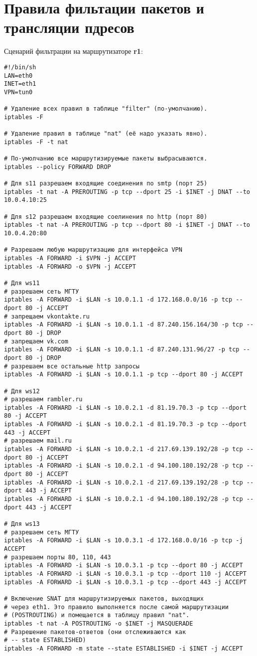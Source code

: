 \documentclass[a4paper,12pt]{article}
\begin{document}
\section{Правила фильтации пакетов и трансляции пдресов}

Сценарий фильтрации на маршрутизаторе \textbf{r1}:

\begin{Verbatim}
#!/bin/sh
LAN=eth0
INET=eth1
VPN=tun0

# Удаление всех правил в таблице "filter" (по-умолчанию).
iptables -F

# Удаление правил в таблице "nat" (её надо указать явно).
iptables -F -t nat

# По-умолчанию все маршрутизируемые пакеты выбрасываются.
iptables --policy FORWARD DROP

# Для s11 разрешаем входящие соединения по smtp (порт 25)
iptables -t nat -A PREROUTING -p tcp --dport 25 -i $INET -j DNAT --to 10.0.4.10:25

# Для s12 разрешаем входящие соелинения по http (порт 80)
iptables -t nat -A PREROUTING -p tcp --dport 80 -i $INET -j DNAT --to 10.0.4.20:80

# Разрешаем любую маршрутизацию для интерфейса VPN
iptables -A FORWARD -i $VPN -j ACCEPT
iptables -A FORWARD -o $VPN -j ACCEPT

# Для ws11
# разрешаем сеть МГТУ
iptables -A FORWARD -i $LAN -s 10.0.1.1 -d 172.168.0.0/16 -p tcp --dport 80 -j ACCEPT
# запрещаем vkontakte.ru
iptables -A FORWARD -i $LAN -s 10.0.1.1 -d 87.240.156.164/30 -p tcp --dport 80 -j DROP
# запрещаем vk.com
iptables -A FORWARD -i $LAN -s 10.0.1.1 -d 87.240.131.96/27 -p tcp --dport 80 -j DROP
# разрешаем все остальные http запросы
iptables -A FORWARD -i $LAN -s 10.0.1.1 -p tcp --dport 80 -j ACCEPT

# Для ws12
# разрешаем rambler.ru
iptables -A FORWARD -i $LAN -s 10.0.2.1 -d 81.19.70.3 -p tcp --dport 80 -j ACCEPT
iptables -A FORWARD -i $LAN -s 10.0.2.1 -d 81.19.70.3 -p tcp --dport 443 -j ACCEPT
# разрешаем mail.ru
iptables -A FORWARD -i $LAN -s 10.0.2.1 -d 217.69.139.192/28 -p tcp --dport 80 -j ACCEPT
iptables -A FORWARD -i $LAN -s 10.0.2.1 -d 94.100.180.192/28 -p tcp --dport 80 -j ACCEPT
iptables -A FORWARD -i $LAN -s 10.0.2.1 -d 217.69.139.192/28 -p tcp --dport 443 -j ACCEPT
iptables -A FORWARD -i $LAN -s 10.0.2.1 -d 94.100.180.192/28 -p tcp --dport 443 -j ACCEPT

# Для ws13
# разрешаем сеть МГТУ
iptables -A FORWARD -i $LAN -s 10.0.3.1 -d 172.168.0.0/16 -p tcp -j ACCEPT
# разрешаем порты 80, 110, 443
iptables -A FORWARD -i $LAN -s 10.0.3.1 -p tcp --dport 80 -j ACCEPT
iptables -A FORWARD -i $LAN -s 10.0.3.1 -p tcp --dport 110 -j ACCEPT
iptables -A FORWARD -i $LAN -s 10.0.3.1 -p tcp --dport 443 -j ACCEPT

# Включение SNAT для маршрутизируемых пакетов, выходящих
# через eth1. Это правило выполняется после самой маршрутизации
# (POSTROUTING) и помещается в таблицу правил "nat".
iptables -t nat -A POSTROUTING -o $INET -j MASQUERADE
# Разрешение пакетов-ответов (они отслеживаются как 
# -- state ESTABLISHED)
iptables -A FORWARD -m state --state ESTABLISHED -i $INET -j ACCEPT
\end{Verbatim}
\end{document}
